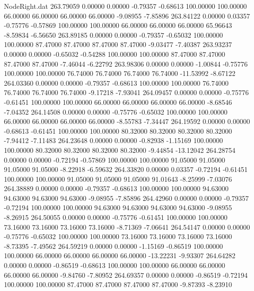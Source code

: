 \begin{filecontents}{NodeRight.dat}
 263.79059    0.00000    0.00000    -0.79357   -0.68613  100.00000  100.00000   66.00000   66.00000   66.00000   66.00000   -9.08955   -7.85896
 263.84122    0.00000    0.03357    -0.75776   -0.57869  100.00000  100.00000   66.00000   66.00000   66.00000   65.96643   -8.59834   -6.56650
 263.89185    0.00000    0.00000    -0.79357   -0.65032  100.00000  100.00000   87.47000   87.47000   87.47000   87.47000   -9.03477   -7.40387
 263.93237    0.00000    0.00000    -0.65032   -0.54288  100.00000  100.00000   87.47000   87.47000   87.47000   87.47000   -7.46044   -6.22792
 263.98306    0.00000    0.00000    -1.00844   -0.75776  100.00000  100.00000   76.74000   76.74000   76.74000   76.74000  -11.53992   -8.67122
 264.03360    0.00000    0.00000    -0.79357   -0.68613  100.00000  100.00000   76.74000   76.74000   76.74000   76.74000   -9.17218   -7.93041
 264.09457    0.00000    0.00000    -0.75776   -0.61451  100.00000  100.00000   66.00000   66.00000   66.00000   66.00000   -8.68546   -7.04352
 264.14508    0.00000    0.00000    -0.75776   -0.65032  100.00000  100.00000   66.00000   66.00000   66.00000   66.00000   -8.55783   -7.34447
 264.19592    0.00000    0.00000    -0.68613   -0.61451  100.00000  100.00000   80.32000   80.32000   80.32000   80.32000   -7.94412   -7.11483
 264.23648    0.00000    0.00000    -0.82938   -1.15169  100.00000  100.00000   80.32000   80.32000   80.32000   80.32000   -9.44854  -13.12042
 264.28754    0.00000    0.00000    -0.72194   -0.57869  100.00000  100.00000   91.05000   91.05000   91.05000   91.05000   -8.22918   -6.59632
 264.33820    0.00000    0.03357    -0.72194   -0.61451  100.00000  100.00000   91.05000   91.05000   91.05000   91.01643   -8.25999   -7.03076
 264.38889    0.00000    0.00000    -0.79357   -0.68613  100.00000  100.00000   94.63000   94.63000   94.63000   94.63000   -9.08955   -7.85896
 264.42960    0.00000    0.00000    -0.79357   -0.72194  100.00000  100.00000   94.63000   94.63000   94.63000   94.63000   -9.08955   -8.26915
 264.50055    0.00000    0.00000    -0.75776   -0.61451  100.00000  100.00000   73.16000   73.16000   73.16000   73.16000   -8.71369   -7.06641
 264.54147    0.00000    0.00000    -0.75776   -0.65032  100.00000  100.00000   73.16000   73.16000   73.16000   73.16000   -8.73395   -7.49562
 264.59219    0.00000    0.00000    -1.15169   -0.86519  100.00000  100.00000   66.00000   66.00000   66.00000   66.00000  -13.22231   -9.93307
 264.64282    0.00000    0.00000    -0.86519   -0.68613  100.00000  100.00000   66.00000   66.00000   66.00000   66.00000   -9.84760   -7.80952
 264.69357    0.00000    0.00000    -0.86519   -0.72194  100.00000  100.00000   87.47000   87.47000   87.47000   87.47000   -9.87393   -8.23910

\end{filecontents}
